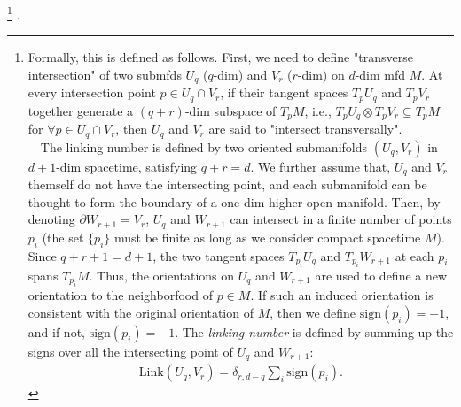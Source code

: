 \documentclass{ltjsarticle}
\theoremstyle{mystyle} %
\numberwithin{equation}{section}
\begin{document}
  \footnote{Formally, this is defined as follows. 
  First, we need to define "transverse intersection" of two submfds $U_q$ ($q$-dim) and $V_r$ ($r$-dim) on $d$-dim mfd $M$. 
  At every intersection point $p\in U_{q}\cap V_r$, if 
  their tangent spaces $T_p U_q$ and $T_p V_r$ together generate a $(q+r)$-dim subspace of $T_pM$, i.e., 
  $T_p U_q \otimes T_p V_r \subseteq T_p M$ for $\forall p\in U_{q}\cap V_r$, then 
  $U_q$ and $V_r$ are said to "intersect transversally". \\
　The linking number is defined by two oriented submanifolds $(U_q, V_r)$ in $d+1$-dim spacetime, 
   satisfying $q+r=d$. We further assume that, $U_q$ and $V_r$ themself do not have the intersecting point, 
   and each submanifold can be thought to form the boundary of a one-dim higher open manifold. 
   Then, by denoting $\partial W_{r+1}=V_r$, $U_q$ and $W_{r+1}$ can intersect in a finite number of points ${p_i}$ 
   (the set $\{p_i\}$ must be finite as long as we consider compact spacetime $M$). 
   Since $q+r+1=d+1$, the two tangent spaces $T_{p_i}U_q$ and $T_{p_i}W_{r+1}$ at each $p_i$ spans $T_{p_i}M$. 
   Thus, the orientations on $U_q$ and $W_{r+1}$ are used to define a new orientation to the neighborfood of $p\in M$. 
   If such an induced orientation is consistent with the original orientation of $M$, 
   then we define $\mathrm{sign}(p_i)=+1$, and if not, $\mathrm{sign}(p_i)=-1$. 
   The \textit{linking number} is defined by summing up the signs over all the intersecting point of $U_q$ and $W_{r+1}$: 
   \begin{align}
    \mathrm{Link}(U_q, V_{r}) = \delta_{r, d-q}\sum_{i}\mathrm{sign}(p_i). 
   \end{align}
   }
  . 
\end{document}
